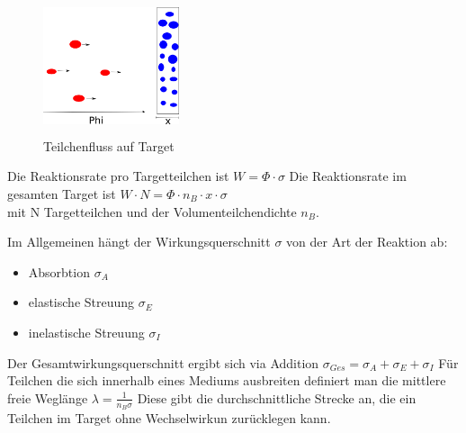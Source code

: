 \documentclass[Ex4_Zusammenfassung.tex]{subfiles}
\begin{document}
\begin{figure}[h]
\centering
\includegraphics[height= 4cm, width=4cm]{fluss.png}
\caption{Teilchenfluss auf Target}
\end{figure}
Die Reaktionsrate pro Targetteilchen ist $ W = \Phi \cdot \sigma $ 
Die Reaktionsrate im gesamten Target ist $ W \cdot N = \Phi \cdot n_{B} \cdot x \cdot \sigma $ \\ 
mit N Targetteilchen und der Volumenteilchendichte $ n_B $. \newline

Im Allgemeinen hängt der Wirkungsquerschnitt  $ \sigma $ von der Art der Reaktion ab: 
\begin{itemize}
\item Absorbtion $ \sigma_{A} $
\item elastische Streuung $ \sigma_{E} $
\item inelastische Streuung $ \sigma_{I} $
\end{itemize}
Der Gesamtwirkungsquerschnitt ergibt sich via Addition $ \sigma_{Ges} = \sigma_{A} + \sigma_{E} + \sigma_{I}  $ \newline
Für Teilchen die sich innerhalb eines Mediums ausbreiten definiert man die mittlere freie Weglänge $ \lambda = \frac{1}{n_B \sigma}$ \newline
Diese gibt die durchschnittliche Strecke an, die ein Teilchen im Target ohne Wechselwirkun zurücklegen kann. \\
\end{document}
